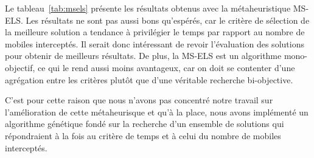     	Le tableau~\ref{tab:msels} présente les résultats obtenus avec la métaheuristique MS-ELS. Les résultats ne sont pas aussi bons qu'espérés, car le critère de sélection de la meilleure solution a tendance à privilégier le temps par rapport au nombre de mobiles interceptés. Il serait donc intéressant de revoir l'évaluation des solutions pour obtenir de meilleurs résultats. De plus, la MS-ELS est un algorithme mono-objectif, ce qui le rend aussi moins avantageux, car on doit se contenter d'une agrégation entre les critères plutôt que d'une véritable recherche bi-objective.
    	
    C'est pour cette raison que nous n'avons pas concentré notre travail sur l'amélioration de cette métaheurisque et qu'à la place, nous avons implémenté un algorithme génétique fondé sur la recherche d'un ensemble de solutions qui répondraient à la fois au critère de temps et à celui du nombre de mobiles interceptés.
    	
